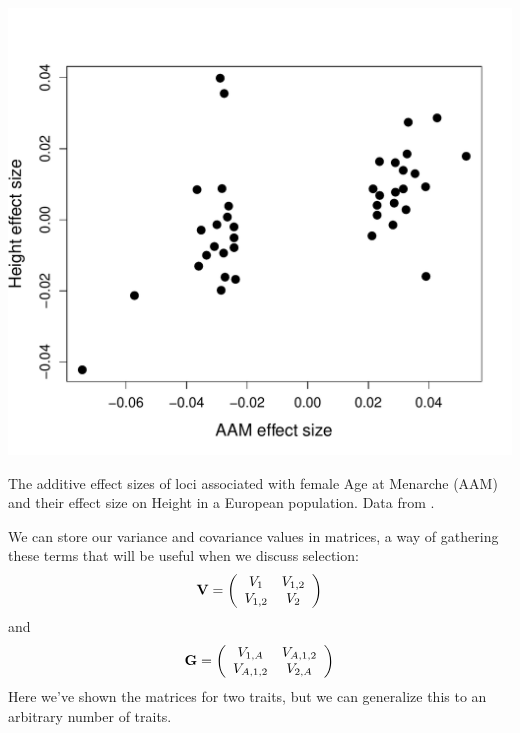 \begin{marginfigure}
\begin{center}
\includegraphics[width= \textwidth]{Journal_figs/Quant_gen/pickrell_pleiotropy/AAM_height.pdf}
\end{center}
\caption{The additive effect sizes of loci associated with female Age
  at Menarche (AAM) and their effect size on Height in a European
  population. Data from \citet{pickrell2016detection}. } \label{fig:AAM_height}   
\end{marginfigure}

We can store our variance and covariance values in matrices, a way of gathering these terms that will be useful when we discuss selection: 
\begin{equation}
\bf{V}= \left( \begin{array}{cc} 
V_{1} & V_{1,2} \\
V_{1,2} & V_{2} \\
\end{array} \right) \label{P_matrix}
\end{equation}
and
\begin{equation}
\bf{G}= \left( \begin{array}{cc} 
V_{1,A} & V_{A,1,2} \\
V_{A,1,2} & V_{2,A} \\
\end{array} \right)  \label{G_matrix}
\end{equation}
Here we've shown the matrices for two traits, but we can generalize this to an arbitrary number of traits.

